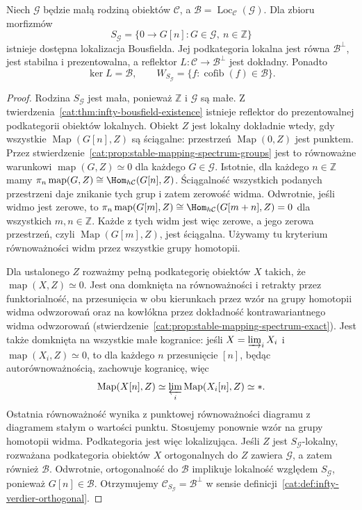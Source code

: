 \begin{twierdzenie}\label{cat:thm:infty-stable-bousfield-generated}
Niech $\mathcal G$ będzie małą rodziną obiektów $\mathcal C$, a $\mathcal B=\operatorname{Loc}_{\mathcal C}(\mathcal G)$. Dla zbioru morfizmów
\[
 S_{\mathcal G}=\{0\to G[n]:G\in\mathcal G,\ n\in\mathbb Z\}
\]
istnieje dostępna lokalizacja Bousfielda. Jej podkategoria lokalna jest równa $\mathcal B^\perp$, jest stabilna i prezentowalna, a reflektor $L:\mathcal C\to\mathcal B^\perp$ jest dokładny. Ponadto
\[
 \ker L=\mathcal B,\qquad
 W_{S_{\mathcal G}}=\{f:\operatorname{cofib}(f)\in\mathcal B\}.
\]
\end{twierdzenie}
\begin{proof}
Rodzina $S_{\mathcal G}$ jest mała, ponieważ $\mathbb Z$ i $\mathcal G$ są małe. Z twierdzenia~\ref{cat:thm:infty-bousfield-existence} istnieje reflektor do prezentowalnej podkategorii obiektów lokalnych. Obiekt $Z$ jest lokalny dokładnie wtedy, gdy wszystkie $\operatorname{Map}(G[n],Z)$ są ściągalne: przestrzeń $\operatorname{Map}(0,Z)$ jest punktem. Przez stwierdzenie~\ref{cat:prop:stable-mapping-spectrum-groups} jest to równoważne warunkowi $\operatorname{map}(G,Z)\simeq0$ dla każdego $G\in\mathcal G$. Istotnie, dla każdego $n\in\mathbb Z$ mamy $\pi_n\operatorname{map}(G,Z)\cong\Hom_{h\mathcal C}(G[n],Z)$. Ściągalność wszystkich podanych przestrzeni daje znikanie tych grup i zatem zerowość widma. Odwrotnie, jeśli widmo jest zerowe, to $\pi_n\operatorname{map}(G[m],Z)\cong\Hom_{h\mathcal C}(G[m+n],Z)=0$ dla wszystkich $m,n\in\mathbb Z$. Każde z tych widm jest więc zerowe, a jego zerowa przestrzeń, czyli $\operatorname{Map}(G[m],Z)$, jest ściągalna. Używamy tu kryterium równoważności widm przez wszystkie grupy homotopii.

Dla ustalonego $Z$ rozważmy pełną podkategorię obiektów $X$ takich, że $\operatorname{map}(X,Z)\simeq0$. Jest ona domknięta na równoważności i retrakty przez funktorialność, na przesunięcia w obu kierunkach przez wzór na grupy homotopii widma odwzorowań oraz na kowłókna przez dokładność kontrawariantnego widma odwzorowań (stwierdzenie~\ref{cat:prop:stable-mapping-spectrum-exact}). Jest także domknięta na wszystkie małe kogranice: jeśli $X=\varinjlim_i X_i$ i $\operatorname{map}(X_i,Z)\simeq0$, to dla każdego $n$ przesunięcie $[n]$, będąc autorównoważnością, zachowuje kogranicę, więc
\[
 \operatorname{Map}(X[n],Z)
 \simeq \varprojlim_i\operatorname{Map}(X_i[n],Z)
 \simeq *.
\]
Ostatnia równoważność wynika z punktowej równoważności diagramu z diagramem stałym o wartości punktu. Stosujemy ponownie wzór na grupy homotopii widma. Podkategoria jest więc lokalizująca. Jeśli $Z$ jest $S_{\mathcal G}$-lokalny, rozważana podkategoria obiektów $X$ ortogonalnych do $Z$ zawiera $\mathcal G$, a zatem również $\mathcal B$. Odwrotnie, ortogonalność do $\mathcal B$ implikuje lokalność względem $S_{\mathcal G}$, ponieważ $G[n]\in\mathcal B$. Otrzymujemy $\mathcal C_{S_{\mathcal G}}=\mathcal B^\perp$ w sensie definicji~\ref{cat:def:infty-verdier-orthogonal}.


\end{proof}
